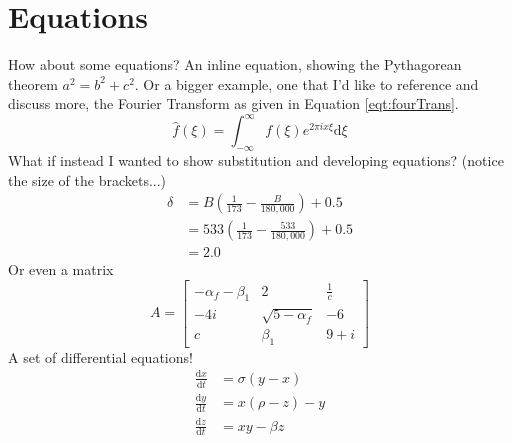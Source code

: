 \documentclass[hidelinks, 12pt]{article}%
\begin{document}
    \section{Equations}
        How about some equations? An inline equation, showing the Pythagorean theorem \(a^{2} = b^{2} + c^{2}\).
        Or a bigger example, one that I'd like to reference and discuss more, the Fourier Transform as given in Equation \ref{eqt:fourTrans}.
        \begin{equation}
            \hat{f}\left(\xi\right) = \int_{-\infty}^{\infty}f\left(\xi\right)e^{2\pi ix\xi}\text{d}\xi
            \label{eqt:fourTrans}
        \end{equation}
        What if instead I wanted to show substitution and developing equations? (notice the size of the brackets...)
        \begin{align}
            \delta & = B\left(\frac{1}{173} - \frac{B}{180,000}\right) + 0.5\nonumber      \\
                   & = 533\left(\frac{1}{173} - \frac{533}{180,000}\right) + 0.5 \nonumber \\
                   & = 2.0 \nonumber
        \end{align}
        Or even a matrix
        \begin{equation*}
            A =
            \begin{bmatrix}
                -\alpha_f-\beta_1 & 2                 & \frac{1}{c} \\
                -4i               & \sqrt{5-\alpha_f} & -6          \\
                c                 & \beta_1           & 9 + i
            \end{bmatrix}
        \end{equation*}
        A set of differential equations!
        \begin{align}
            \frac{\text{d}x}{\text{d}t} &= \sigma (y-x)\\
            \frac{\text{d}y}{\text{d}t} &= x(\rho -z)-y\\
            \frac{\text{d}z}{\text{d}t} &= xy-\beta z
        \end{align}


    \clearpage
\end{document}
